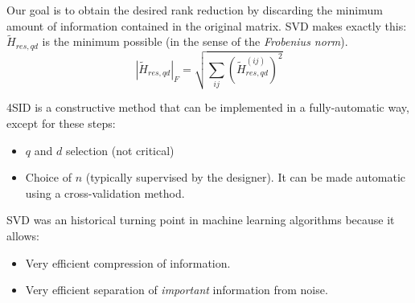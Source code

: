 Our goal is to obtain the desired rank reduction by discarding the minimum amount of information contained in the original matrix.
SVD makes exactly this: $\tilde{H}_{res,qd}$ is the minimum possible (in the sense of the \emph{Frobenius norm}).
\[
    \left|\tilde{H}_{res,qd}\right|_F = \sqrt{\sum_{ij} \left(\tilde{H}_{res,qd}^{(ij)} \right)^2}
\]

\begin{remark}
    4SID is a constructive method that can be implemented in a fully-automatic way, except for these steps:
    \begin{itemize}
        \item $q$ and $d$ selection (not critical)
        \item Choice of $n$ (typically supervised by the designer). It can be made automatic using a cross-validation method.
    \end{itemize}
\end{remark}

\begin{remark}
    SVD was an historical turning point in machine learning algorithms because it allows:
    \begin{itemize}
        \item Very efficient compression of information.
        \item Very efficient separation of \emph{important} information from noise.
    \end{itemize}
\end{remark}
